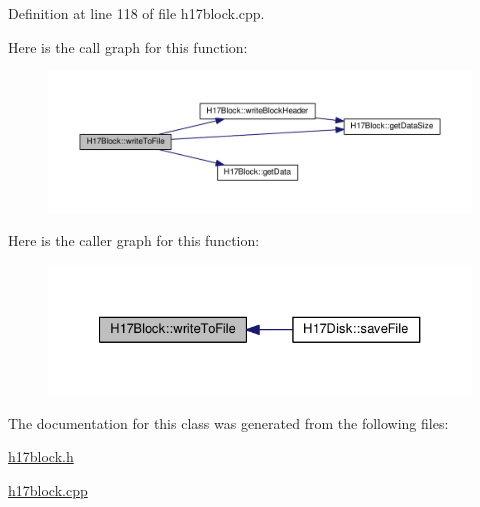 Definition at line 118 of file h17block.\+cpp.



Here is the call graph for this function\+:
\nopagebreak
\begin{figure}[H]
\begin{center}
\leavevmode
\includegraphics[width=350pt]{classH17Block_a59901675cd140c907fb6de4c8e0452d5_cgraph}
\end{center}
\end{figure}




Here is the caller graph for this function\+:
\nopagebreak
\begin{figure}[H]
\begin{center}
\leavevmode
\includegraphics[width=327pt]{classH17Block_a59901675cd140c907fb6de4c8e0452d5_icgraph}
\end{center}
\end{figure}




The documentation for this class was generated from the following files\+:\begin{DoxyCompactItemize}
\item 
\hyperlink{h17block_8h}{h17block.\+h}\item 
\hyperlink{h17block_8cpp}{h17block.\+cpp}\end{DoxyCompactItemize}
